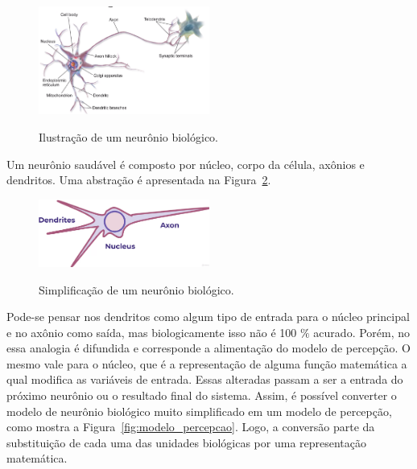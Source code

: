             \begin{figure}[H]
                \centering
                \caption{Ilustração de um neurônio biológico.}
                \includegraphics[width=0.5\textwidth]{fig/2-fundamentacao/model_perceptron/neuronio_biologico.png}
                \fonte{}
                \label{fig:neuronio_biologico}
            \end{figure}
            
            Um neurônio saudável é composto por núcleo, corpo da célula, axônios e dendritos. Uma abstração é apresentada na Figura~\ref{fig:neuro_biologico_simplificado}.
    
            \begin{figure}[H]
                \centering
                \caption{Simplificação de um neurônio biológico.}
                \includegraphics[width=0.5\textwidth]{fig/2-fundamentacao/model_perceptron/neuronio_simplificado.png}
                \fonte{}
                \label{fig:neuro_biologico_simplificado}
            \end{figure}
            
            Pode-se pensar nos dendritos como algum tipo de entrada para o núcleo principal e no axônio como saída, mas biologicamente isso não é 100 $\%$ acurado. Porém, no \ap essa analogia é difundida e corresponde a alimentação do modelo de percepção. O mesmo vale para o núcleo, que é a representação de alguma função matemática a qual modifica as variáveis de entrada. Essas alteradas passam a ser a entrada do próximo neurônio ou o resultado final do sistema. Assim, é possível converter o modelo de neurônio biológico muito simplificado em um modelo de percepção, como mostra a Figura~\ref{fig:modelo_percepcao}. Logo, a conversão parte da substituição de cada uma das unidades biológicas por uma representação matemática. 
    
